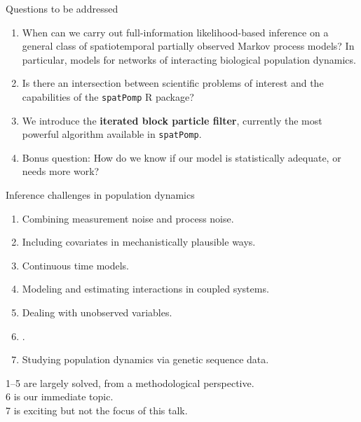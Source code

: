 \documentclass{beamer}
\begin{document}
\begin{frame}{Questions to be addressed}

  \begin{enumerate}
  \item When can we carry out full-information likelihood-based inference on a general class of spatiotemporal partially observed Markov process models? In particular, models for networks of interacting biological population dynamics.

    \vspace{2mm}
    
  \item Is there an intersection between scientific problems of interest and the capabilities of the \texttt{spatPomp} R package?

        \vspace{2mm}

\item We introduce the {\bf iterated block particle filter}, currently the most powerful algorithm available in \texttt{spatPomp}.

  \vspace{2mm}

\item Bonus question: How do we know if our model is statistically adequate, or needs more work?
  
    \end{enumerate}
\end{frame}

\newcommand\challengeSep{\vspace{3mm}}

\begin{frame}{Inference challenges in population dynamics}

  \begin{enumerate}
\item Combining measurement noise and process noise.
\item Including covariates in mechanistically plausible ways.
\item  Continuous time models.
\item  Modeling and estimating interactions in coupled systems.
\item  Dealing with unobserved variables.
\item  {}.
\item  Studying population dynamics via genetic sequence data.
  \end{enumerate}

  \vspace{4mm}
  
  1--5 are largely solved, from a methodological perspective.\\
  6 is our immediate topic.\\
  7 is exciting but not the focus of this talk.


  \vspace{4mm}

  
\end{frame}
\end{document}
